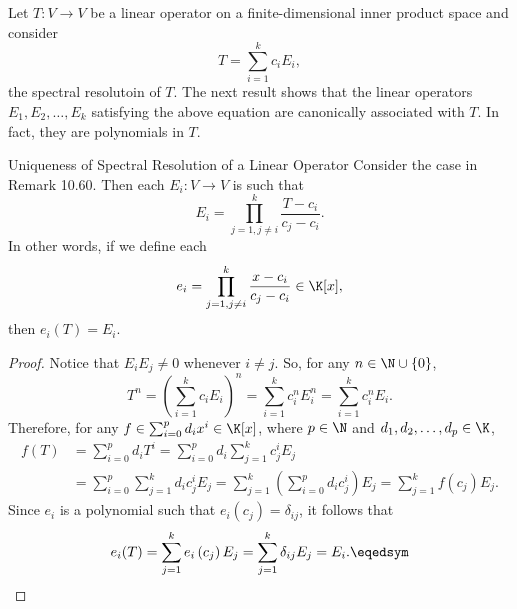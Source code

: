 \documentclass[linearalgebra]{subfiles}
\begin{document}
    \begin{remark}
        Let $T:V\to V$ be a linear operator on a finite-dimensional inner product space and consider
        \begin{equation*}
            T = \sum^{k}_{i=1} c_iE_i,
        \end{equation*}
        the spectral resolutoin of $T$. The next result shows that the linear operators $E_1,E_2,\ldots,E_k$ satisfying the above equation are canonically associated with $T$. In fact, they are polynomials in $T$.
    \end{remark}

    \begin{cor}{Uniqueness of Spectral Resolution of a Linear Operator}
        Consider the case in Remark 10.60. Then each $E_i:V\to V$ is such that
        \begin{equation*}
            E_i = \prod^{k}_{j=1, j\neq i} \frac{T-c_i}{c_j-c_i}.
        \end{equation*}
        In other words, if we define each
        \begin{equation*}
            e_i = \prod^{k}_{j=1, j\neq i} \frac{x-c_i}{c_j-c_i}\in\K[x],
        \end{equation*}
        then $e_i(T) = E_i$.
    \end{cor}	

    \begin{proof}
        Notice that $E_iE_j\neq 0$ whenever $i\neq j$. So, for any $n\in\N\cup\left\lbrace 0 \right\rbrace$, 
        \begin{equation*}
            T^n = \left( \sum^{k}_{i=1} c_iE_i \right) ^n = \sum^{k}_{i=1} c_i^n E_i^n = \sum^{k}_{i=1} c_i^nE_i.
        \end{equation*}
        Therefore, for any $f\in \sum^{p}_{i=0} d_ix^i\in\K[x]$, where $p\in\N$ and $d_1,d_2,\ldots,d_p\in\K$,
        \begin{align*}
            f(T) & = \sum^{p}_{i=0} d_iT^i = \sum^{p}_{i=0} d_i \sum^{k}_{j=1} c_j^iE_j \\
                 & = \sum^{p}_{i=0} \sum^{k}_{j=1} d_ic_j^iE_j = \sum^{k}_{j=1} \left( \sum^{p}_{i=0} d_ic_j^i \right) E_j = \sum^{k}_{j=1} f\left( c_j \right) E_j.
        \end{align*} 
        Since $e_i$ is a polynomial such that $e_i\left( c_j \right) = \delta_{ij}$, it follows that
        \begin{equation*}
            e_i(T) = \sum^{k}_{j=1} e_i\left( c_j \right) E_j = \sum^{k}_{j=1} \delta_{ij}E_j = E_i. \eqedsym
        \end{equation*}
    \end{proof}
\end{document}
